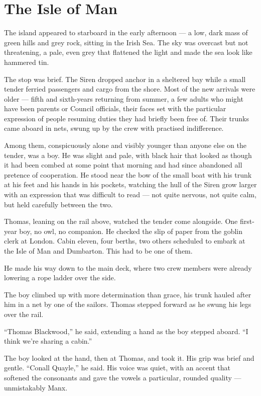 
\chapter{The Isle of Man}

The island appeared to starboard in the early afternoon --- a low, dark mass of green hills and grey rock, sitting in the Irish Sea. The sky was overcast but not threatening, a pale, even grey that flattened the light and made the sea look like hammered tin.

The stop was brief. The Siren dropped anchor in a sheltered bay while a small tender ferried passengers and cargo from the shore. Most of the new arrivals were older --- fifth and sixth-years returning from summer, a few adults who might have been parents or Council officials, their faces set with the particular expression of people resuming duties they had briefly been free of. Their trunks came aboard in nets, swung up by the crew with practised indifference.

Among them, conspicuously alone and visibly younger than anyone else on the tender, was a boy. He was slight and pale, with black hair that looked as though it had been combed at some point that morning and had since abandoned all pretence of cooperation. He stood near the bow of the small boat with his trunk at his feet and his hands in his pockets, watching the hull of the Siren grow larger with an expression that was difficult to read --- not quite nervous, not quite calm, but held carefully between the two.

Thomas, leaning on the rail above, watched the tender come alongside. One first-year boy, no owl, no companion. He checked the slip of paper from the goblin clerk at London. Cabin eleven, four berths, two others scheduled to embark at the Isle of Man and Dumbarton. This had to be one of them.

He made his way down to the main deck, where two crew members were already lowering a rope ladder over the side.

The boy climbed up with more determination than grace, his trunk hauled after him in a net by one of the sailors. Thomas stepped forward as he swung his legs over the rail.

\enquote{Thomas Blackwood,} he said, extending a hand as the boy stepped aboard. \enquote{I think we're sharing a cabin.}

The boy looked at the hand, then at Thomas, and took it. His grip was brief and gentle. \enquote{Conall Quayle,} he said. His voice was quiet, with an accent that softened the consonants and gave the vowels a particular, rounded quality --- unmistakably Manx.


